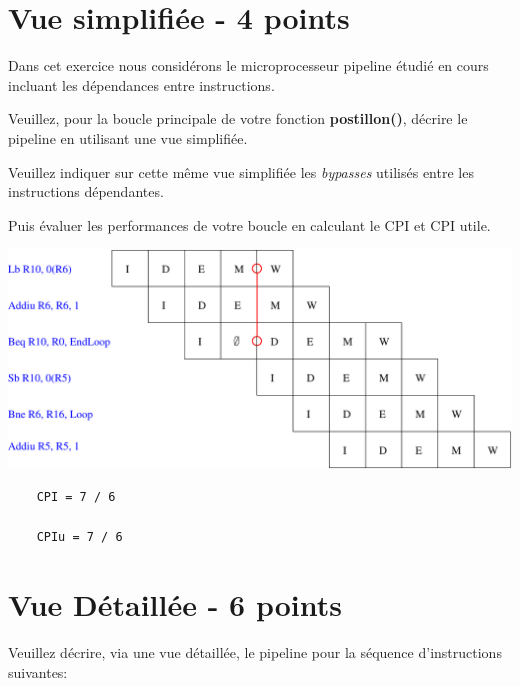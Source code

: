 %
%

\section{Vue simplifi\'ee - 4 points}

Dans cet exercice nous consid\'erons le microprocesseur pipeline \'etudi\'e
en cours incluant les d\'ependances entre instructions.

Veuillez, pour la boucle principale de votre fonction \textbf{postillon()},
d\'ecrire le pipeline en utilisant une vue simplifi\'ee.

Veuillez indiquer sur cette m\^eme vue simplifi\'ee les \textit{bypasses}
utilis\'es entre les instructions d\'ependantes.

Puis \'evaluer les performances de votre boucle en calculant le CPI et CPI
utile.

\begin{correction}

  \begin{center}
    \includegraphics[scale=0.8]{figures/correction-vue-simplifiee.pdf}
  \end{center}

  \begin{verbatim}
    CPI = 7 / 6

    CPIu = 7 / 6
  \end{verbatim}

\end{correction}

%
%

\section{Vue D\'etaill\'ee - 6 points}

Veuillez d\'ecrire, via une vue d\'etaill\'ee, le pipeline pour la s\'equence
d'instructions suivantes:

